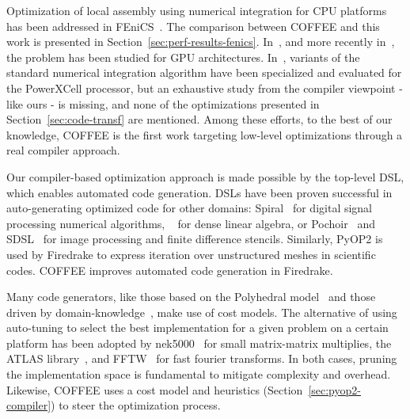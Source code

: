 \documentclass[conference]{IEEEtran}
\begin{document}
Optimization of local assembly using numerical integration for CPU platforms has been addressed in FEniCS~\cite{quadrature1}. The comparison between COFFEE and this work is presented in Section~\ref{sec:perf-results-fenics}. In~\cite{Markall20101815}, and more recently in~\cite{petsc-integration-gpu}, the problem has been studied for GPU architectures. In~\cite{assembly-opencl}, variants of the standard numerical integration algorithm have been specialized and evaluated for the PowerXCell processor, but an exhaustive study from the compiler viewpoint - like ours - is missing, and none of the optimizations presented in Section~\ref{sec:code-transf} are mentioned. Among these efforts, to the best of our knowledge, COFFEE is the first work targeting low-level optimizations through a real compiler approach.

Our compiler-based optimization approach is made possible by the top-level DSL, which enables automated code generation. DSLs have been proven successful in auto-generating optimized code for other domains: Spiral~\cite{Pueschel:05} for digital signal processing numerical algorithms, ~\cite{Spampinato:14} for dense linear algebra, or Pochoir~\cite{pochoir} and SDSL~\cite{stencil-compiler} for image processing and finite difference stencils. Similarly, PyOP2 is used by Firedrake to express iteration over unstructured meshes in scientific codes. COFFEE improves automated code generation in Firedrake.

Many code generators, like those based on the Polyhedral model~\cite{PLUTO} and those driven by domain-knowledge~\cite{modeldriven}, make use of cost models. The alternative of using auto-tuning to select the best implementation for a given problem on a certain platform has been adopted by nek5000~\cite{nek5000} for small matrix-matrix multiplies, the ATLAS library~\cite{ATLAS}, and FFTW~\cite{FFTW} for fast fourier transforms. In both cases, pruning the implementation space is fundamental to mitigate complexity and overhead. Likewise, COFFEE uses a cost model and heuristics (Section~\ref{sec:pyop2-compiler}) to steer the optimization process. 


\end{document}
